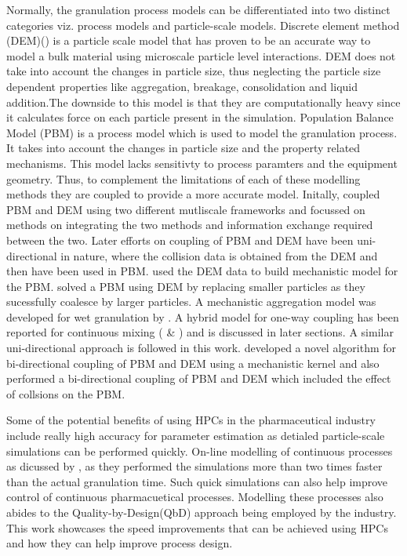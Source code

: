 \documentclass[preprint,11pt,authoryear]{elsarticle}
\begin{document}
\par  Normally, the granulation process models can be differentiated into two distinct categories viz. process models and particle-scale models\citep{Barrasso2015ces}. Discrete element method (DEM)(\cite{Cundall1979}) is a particle scale model that has proven to be an accurate way to model a bulk material using microscale particle level interactions.  DEM does not take into account the changes in particle size, thus neglecting the particle size dependent properties like aggregation, breakage, consolidation and liquid addition\citep{Barrasso2015ces}.The downside to this model is that they are computationally heavy since it calculates force on each particle present in the simulation. Population Balance Model (PBM) is a process model which is used to model the granulation process. It takes into account the changes in particle size and the property related mechanisms. This model lacks sensitivty to process paramters and the equipment geometry. Thus, to complement the limitations of each of these modelling methods they are coupled to provide a more accurate model. Initally, \cite{ingram2005} coupled PBM and DEM using two different mutliscale frameworks and focussed on methods on integrating the two methods and information exchange required between the two. Later efforts on coupling of PBM and DEM have been uni-directional in nature, where the collision data is obtained from the DEM and then have been used in PBM. \cite{gantt2006} used the DEM data to build mechanistic model for the PBM. \cite{Goldschmidt2003} solved a PBM using DEM by replacing smaller particles as they sucessfully coalesce by larger particles. A mechanistic aggregation model was developed for wet granulation by \cite{Reinhold2012}. A hybrid model for one-way coupling has been reported for continuous mixing (\cite{sen2013} \& \cite{sen2013b}) and is discussed in later sections. 
A similar uni-directional approach is followed in this work. \cite{Barrasso2015ces} developed a novel algorithm for bi-directional coupling of PBM and DEM using a mechanistic kernel and \citep{Barrasso2015cerd} also performed a bi-directional coupling of PBM and DEM which included the effect of collsions on the PBM.

\par Some of the potential benefits of using HPCs in the pharmaceutical industry include really high accuracy for parameter estimation as detialed particle-scale simulations can be performed quickly. On-line modelling of continuous processes as dicussed by \citep{Bettencourt2017}, as they performed the simulations more than two times faster than the actual granulation time. Such quick simulations can also help improve control of continuous pharmacuetical processes. Modelling these processes also abides to the Quality-by-Design(QbD) approach being employed by the industry. This work showcases the speed improvements that can be achieved using HPCs and how they can help improve process design.
\end{document}

